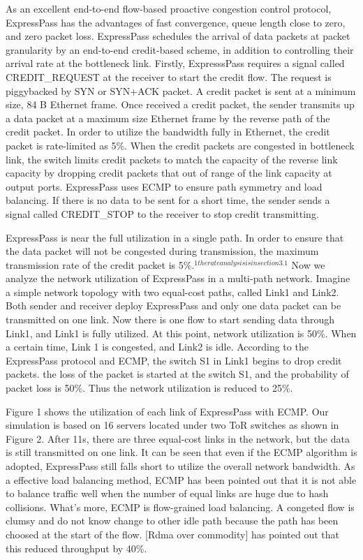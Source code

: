 \documentclass[conference,compsoc]{IEEEtran}
\begin{document}
As an excellent end-to-end flow-based proactive congestion control protocol, ExpressPass has the advantages of fast convergence, queue length close to zero, and zero packet loss. ExpressPass schedules the arrival of data packets at packet granularity by an end-to-end credit-based scheme, in addition to controlling their arrival rate at the bottleneck link. Firstly, ExpresssPass requires a signal called CREDIT\_REQUEST at the receiver to start the credit flow.  The request is piggybacked by SYN or SYN+ACK packet. A credit packet is sent at a minimum size, 84 B Ethernet frame. Once received a credit packet, the sender transmits up a data packet at a maximum size Ethernet frame by the reverse path of the credit packet. In order to utilize the bandwidth fully in Ethernet, the credit packet is rate-limited as 5\%. When the credit packets are congested in bottleneck link, the switch limits credit packets to match the capacity of the reverse link capacity by dropping credit packets that out of range of the link capacity at output ports. ExpressPass uses ECMP to ensure path symmetry and load balancing. If there is no data to be sent for a short time, the sender sends a signal called CREDIT\_STOP to the receiver to stop credit transmitting.

ExpressPass is near the full utilization in a single path. In order to ensure that the data packet will not be congested during transmission, the maximum transmission rate of the credit packet is 5\%.$^{1 the rate analysis is in section 3.1}$ Now we analyze the network utilization of ExpressPass in a multi-path network. Imagine a simple network topology with two equal-cost paths, called Link1 and Link2. Both sender and receiver deploy ExpressPass and only one data packet can be transmitted on one link. Now there is one flow to start sending data through Link1, and Link1 is fully utilized. At this point, network utilization is 50\%. When a certain time, Link 1 is congested, and Link2 is idle. According to the ExpressPass protocol and ECMP, the switch S1 in Link1 begins to drop credit packets. the loss of the packet is started at the switch S1, and the probability of packet loss is 50\%. Thus the network utilization is reduced to 25\%.

Figure 1 shows the utilization of each link of ExpressPass with ECMP. Our simulation is based on 16 servers located under two ToR switches as shown in Figure 2. After 11s, there are three equal-cost links in the network, but the data is still transmitted on one link. It can be seen that even if the ECMP algorithm is adopted, ExpressPass still falls short to utilize the overall network bandwidth. As a effective load balancing method, ECMP has been pointed out that it is not able to balance traffic well when the number of equal links are huge due to hash collisions. What's more, ECMP is flow-grained load balancing. A congeted flow is clumsy and do not know change to other idle path because the path has been choosed at the start of the flow. [Rdma over commodity] has pointed out that this reduced throughput by 40\%.
\end{document}
